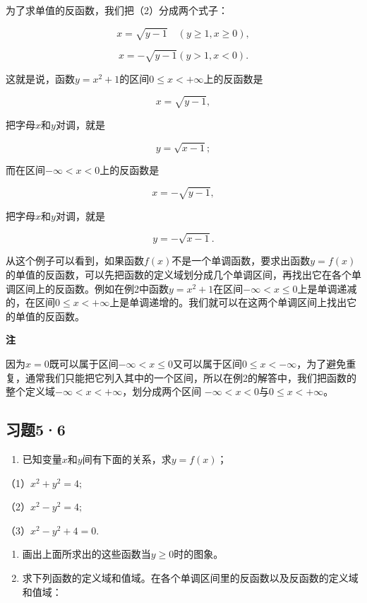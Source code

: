 为了求单值的反函数，我们把（2）分成两个式子：

\[
x = \sqrt{y - 1} \quad (y\geqslant1,x\geqslant0),
\]

\[
x = - \sqrt{y - 1} (y > 1, x < 0).
\]

这就是说，函数\(y = x^2 + 1\)的区间\(0 \leqslant x < +\infty\)上的反函数是

\[
x = \sqrt{y - 1},
\]

把字母\(x\)和\(y\)对调，就是

\[
y = \sqrt{x - 1};
\]

而在区间\(-\infty < x < 0\)上的反函数是

\[
x = - \sqrt{y - 1},
\]

把字母\(x\)和\(y\)对调，就是

\[
y = - \sqrt{x - 1}.
\]

从这个例子可以看到，如果函数\(f(x)\)不是一个单调函数，要求出函数\(y = f(x)\)的单值的反函数，可以先把函数的定义域划分成几个单调区间，再找出它在各个单调区间上的反函数。例如在例2中函数\(y=x^2+1\)在区间\(-\infty < x \leqslant 0\)上是单调递减的，在区间\(0 \leqslant x < +\infty\)上是单调递增的。我们就可以在这两个单调区间上找出它的单值的反函数。

\textbf{注}

因为\(x = 0\)既可以属于区间\(-\infty < x \leqslant 0\)又可以属于区间\(0 \leqslant x < -\infty\)，为了避免重复，通常我们只能把它列入其中的一个区间，所以在例2的解答中，我们把函数的整个定义域\(-\infty < x < +\infty\)，划分成两个区间
\(-\infty < x < 0\)与\(0 \leqslant x < +\infty\)。

\subsection{习题5·6}

\begin{enumerate}
\item
  已知变量\(x\)和\(y\)间有下面的关系，求\(y = f(x)\)；
\end{enumerate}

（1）\(x^{2} + y^{2} = 4;\)

（2）\(x^{2} - y^{2} = 4;\)

（3）\(x^{2} - y^{2} + 4 = 0.\)

\begin{enumerate}[start=2]
\item
  画出上面所求出的这些函数当\(y \geqslant 0\)时的图象。
\item
  求下列函数的定义域和值域。在各个单调区间里的反函数以及反函数的定义域和值域：
\end{enumerate}

